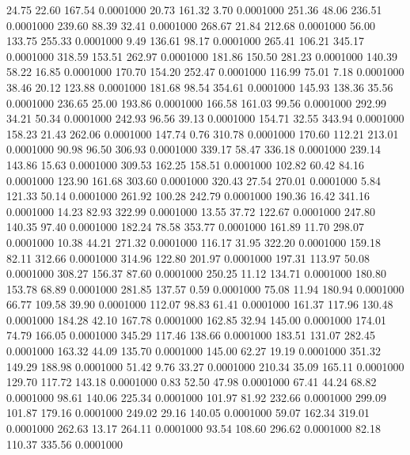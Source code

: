   24.75   22.60  167.54   0.0001000
  20.73  161.32    3.70   0.0001000
 251.36   48.06  236.51   0.0001000
 239.60   88.39   32.41   0.0001000
 268.67   21.84  212.68   0.0001000
  56.00  133.75  255.33   0.0001000
   9.49  136.61   98.17   0.0001000
 265.41  106.21  345.17   0.0001000
 318.59  153.51  262.97   0.0001000
 181.86  150.50  281.23   0.0001000
 140.39   58.22   16.85   0.0001000
 170.70  154.20  252.47   0.0001000
 116.99   75.01    7.18   0.0001000
  38.46   20.12  123.88   0.0001000
 181.68   98.54  354.61   0.0001000
 145.93  138.36   35.56   0.0001000
 236.65   25.00  193.86   0.0001000
 166.58  161.03   99.56   0.0001000
 292.99   34.21   50.34   0.0001000
 242.93   96.56   39.13   0.0001000
 154.71   32.55  343.94   0.0001000
 158.23   21.43  262.06   0.0001000
 147.74    0.76  310.78   0.0001000
 170.60  112.21  213.01   0.0001000
  90.98   96.50  306.93   0.0001000
 339.17   58.47  336.18   0.0001000
 239.14  143.86   15.63   0.0001000
 309.53  162.25  158.51   0.0001000
 102.82   60.42   84.16   0.0001000
 123.90  161.68  303.60   0.0001000
 320.43   27.54  270.01   0.0001000
   5.84  121.33   50.14   0.0001000
 261.92  100.28  242.79   0.0001000
 190.36   16.42  341.16   0.0001000
  14.23   82.93  322.99   0.0001000
  13.55   37.72  122.67   0.0001000
 247.80  140.35   97.40   0.0001000
 182.24   78.58  353.77   0.0001000
 161.89   11.70  298.07   0.0001000
  10.38   44.21  271.32   0.0001000
 116.17   31.95  322.20   0.0001000
 159.18   82.11  312.66   0.0001000
 314.96  122.80  201.97   0.0001000
 197.31  113.97   50.08   0.0001000
 308.27  156.37   87.60   0.0001000
 250.25   11.12  134.71   0.0001000
 180.80  153.78   68.89   0.0001000
 281.85  137.57    0.59   0.0001000
  75.08   11.94  180.94   0.0001000
  66.77  109.58   39.90   0.0001000
 112.07   98.83   61.41   0.0001000
 161.37  117.96  130.48   0.0001000
 184.28   42.10  167.78   0.0001000
 162.85   32.94  145.00   0.0001000
 174.01   74.79  166.05   0.0001000
 345.29  117.46  138.66   0.0001000
 183.51  131.07  282.45   0.0001000
 163.32   44.09  135.70   0.0001000
 145.00   62.27   19.19   0.0001000
 351.32  149.29  188.98   0.0001000
  51.42    9.76   33.27   0.0001000
 210.34   35.09  165.11   0.0001000
 129.70  117.72  143.18   0.0001000
   0.83   52.50   47.98   0.0001000
  67.41   44.24   68.82   0.0001000
  98.61  140.06  225.34   0.0001000
 101.97   81.92  232.66   0.0001000
 299.09  101.87  179.16   0.0001000
 249.02   29.16  140.05   0.0001000
  59.07  162.34  319.01   0.0001000
 262.63   13.17  264.11   0.0001000
  93.54  108.60  296.62   0.0001000
  82.18  110.37  335.56   0.0001000
